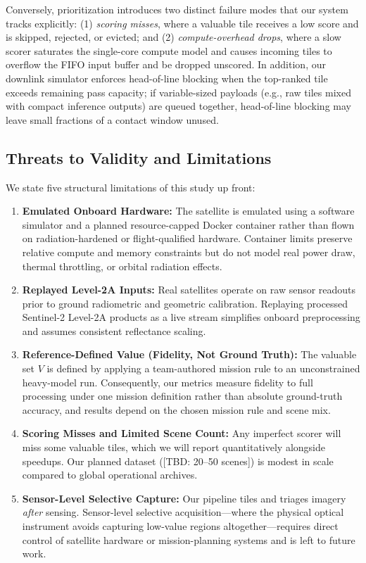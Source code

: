\documentclass[conference]{IEEEtran}
\begin{document}
Conversely, prioritization introduces two distinct failure modes that our system tracks explicitly: (1) \emph{scoring misses}, where a valuable tile receives a low score and is skipped, rejected, or evicted; and (2) \emph{compute-overhead drops}, where a slow scorer saturates the single-core compute model and causes incoming tiles to overflow the FIFO input buffer and be dropped unscored. In addition, our downlink simulator enforces head-of-line blocking when the top-ranked tile exceeds remaining pass capacity; if variable-sized payloads (e.g., raw tiles mixed with compact inference outputs) are queued together, head-of-line blocking may leave small fractions of a contact window unused.

\subsection{Threats to Validity and Limitations}
We state five structural limitations of this study up front:
\begin{enumerate}
    \item \textbf{Emulated Onboard Hardware:} The satellite is emulated using a software simulator and a planned resource-capped Docker container rather than flown on radiation-hardened or flight-qualified hardware. Container limits preserve relative compute and memory constraints but do not model real power draw, thermal throttling, or orbital radiation effects.
    \item \textbf{Replayed Level-2A Inputs:} Real satellites operate on raw sensor readouts prior to ground radiometric and geometric calibration. Replaying processed Sentinel-2 Level-2A products as a live stream simplifies onboard preprocessing and assumes consistent reflectance scaling.
    \item \textbf{Reference-Defined Value (Fidelity, Not Ground Truth):} The valuable set $V$ is defined by applying a team-authored mission rule to an unconstrained heavy-model run. Consequently, our metrics measure fidelity to full processing under one mission definition rather than absolute ground-truth accuracy, and results depend on the chosen mission rule and scene mix.
    \item \textbf{Scoring Misses and Limited Scene Count:} Any imperfect scorer will miss some valuable tiles, which we will report quantitatively alongside speedups. Our planned dataset ([TBD: 20--50 scenes]) is modest in scale compared to global operational archives.
    \item \textbf{Sensor-Level Selective Capture:} Our pipeline tiles and triages imagery \emph{after} sensing. Sensor-level selective acquisition---where the physical optical instrument avoids capturing low-value regions altogether---requires direct control of satellite hardware or mission-planning systems and is left to future work.
\end{enumerate}
\end{document}
